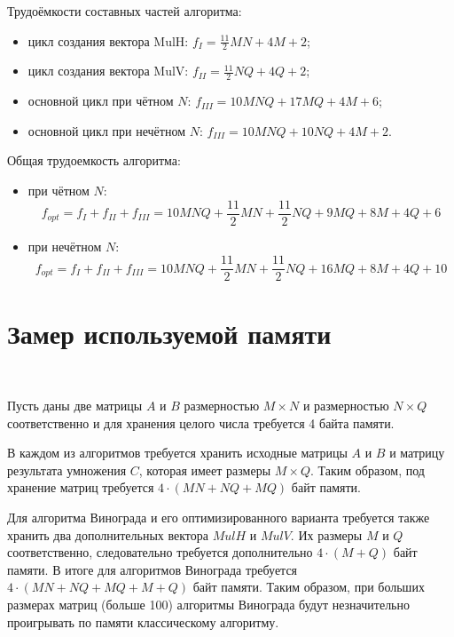 \documentclass[12pt]{report}
\begin{document}
	Трудоёмкости составных частей алгоритма:
	\begin{itemize}
		\item цикл создания вектора MulH: $f_{I} = \frac{11}{2}MN + 4M + 2$;
		\item цикл создания вектора MulV:  $f_{II} = \frac{11}{2}NQ + 4Q + 2$;
		\item основной цикл при чётном $N$: $f_{III} = 10MNQ + 17MQ + 4M + 6$;
		\item основной цикл при нечётном $N$: $f_{III} = 10MNQ + 10NQ + 4M + 2$.
	\end{itemize}
	Общая трудоемкость алгоритма:
	\begin{itemize}
		\item при чётном $N$:
		\begin{equation}
		\label{complex_vin_even2}
		f_{opt} = f_{I} + f_{II} + f_{III} = 10MNQ + \frac{11}{2}MN + \frac{11}{2}NQ + 9MQ + 8M + 4Q + 6
		\end{equation}
		\item при нечётном $N$:
		\begin{equation}
		\label{complex_vin_odd2}
		f_{opt} = f_{I} + f_{II} + f_{III} = 10MNQ + \frac{11}{2}MN + \frac{11}{2}NQ + 16MQ + 8M + 4Q + 10
		\end{equation}
	\end{itemize}
	
	
	\section{Замер используемой памяти}
	
	~\
	
	Пусть даны две матрицы $A$ и $B$ размерностью $M\times N$ и размерностью $N \times Q$ соответственно и для хранения целого числа требуется 4 байта памяти.
	
	В каждом из алгоритмов требуется хранить исходные матрицы $A$ и $B$ и матрицу результата умножения $C$, которая имеет размеры $M \times Q$. Таким образом, под хранение матриц требуется $4 \cdot (MN + NQ + MQ)$ байт памяти.
	
	Для алгоритма Винограда и его оптимизированного варианта требуется также хранить два дополнительных вектора $MulH$ и $MulV$. Их размеры $M$ и $Q$ соответственно, следовательно требуется дополнительно $4 \cdot (M + Q)$ байт памяти. В итоге для алгоритмов Винограда требуется $4 \cdot (MN + NQ + MQ + M + Q)$ байт памяти. Таким образом, при больших размерах матриц (больше 100) алгоритмы Винограда будут незначительно проигрывать по памяти классическому алгоритму.
	
\end{document}
